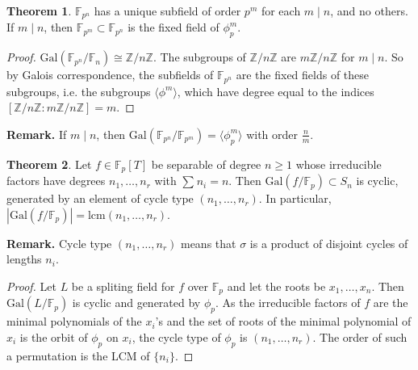 \documentclass{article}
\theoremstyle{definition}
\newtheorem{theorem}{Theorem}[section]
\begin{document}
\begin{theorem}
    $\mathbb{F}_{p^n}$ has a unique subfield of order $p^m$ for each $m \mid n$, and no others. If $m \mid n$, then $\mathbb{F}_{p^m} \subset \mathbb{F}_{p^n}$ is the fixed field of $\phi_p^m$.
\end{theorem}
\begin{proof}
    $\text{Gal}(\mathbb{F}_{p^n}/\mathbb{F}_n) \cong \mathbb{Z}/n\mathbb{Z}$. The subgroups of $\mathbb{Z}/n\mathbb{Z}$ are $m\mathbb{Z}/n\mathbb{Z}$ for $m \mid n$. So by Galois correspondence, the subfields of $\mathbb{F}_{p^n}$ are the fixed fields of these subgroups, i.e. the subgroups $\langle\phi^m \rangle$, which have degree equal to the indices $[\mathbb{Z}/n\mathbb{Z} : m \mathbb{Z}/ n\mathbb{Z}] = m$.
\end{proof}
\textbf{Remark.} If $m \mid n$, then $\text{Gal}(\mathbb{F}_{p^n}/\mathbb{F}_{p^m}) = \langle \phi_p^m\rangle$ with order $\frac{n}{m}$.  
\begin{theorem}
    Let $f \in \mathbb{F}_p[T]$ be separable of degree $n\ge 1$ whose irreducible factors have degrees $n_1,\ldots,n_r$ with $\sum_{}^{} n_i =n$. Then $\text{Gal}(f/\mathbb{F}_p) \subset S_n$ is cyclic, generated by an element of cycle type $(n_1,\ldots,n_r)$. In particular, $|\text{Gal}(f/\mathbb{F}_p)|=\text{lcm}(n_1,\ldots,n_r)$.
\end{theorem}
\textbf{Remark.} Cycle type $(n_1,\ldots,n_r)$ means that $\sigma$ is a product of disjoint cycles of lengths $n_i$.
\begin{proof}
    Let $L$ be a spliting field for $f$ over $\mathbb{F}_p$ and let the roots be $x_1,\ldots,x_n$. Then $\text{Gal}(L/\mathbb{F}_p)$ is cyclic and generated by $\phi_p$. As the irreducible factors of $f$ are the minimal polynomials of the $x_i$'s and the set of roots of the minimal polynomial of $x_i$ is the orbit of $\phi_p$ on $x_i$, the cycle type of $\phi_p$ is $(n_1,\ldots,n_r)$. The order of such a permutation is the LCM of $\{n_i\}$.
\end{proof}
\end{document}
